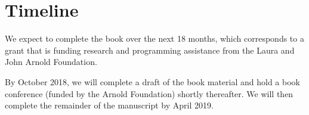 \documentclass[11pt]{article}
\begin{document}
\section{Timeline}

We expect to complete the book over the next 18 months, which corresponds to a grant that is funding research and programming assistance from the Laura and John Arnold Foundation.

By October 2018, we will complete a draft of the book material and hold a book conference (funded by the Arnold Foundation) shortly thereafter. We will then complete the remainder of the manuscript by April 2019.
\end{document}
